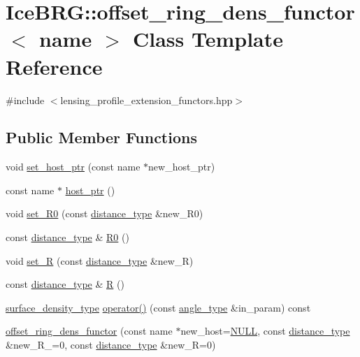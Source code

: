 \hypertarget{classIceBRG_1_1offset__ring__dens__functor}{}\section{Ice\+B\+R\+G\+:\+:offset\+\_\+ring\+\_\+dens\+\_\+functor$<$ name $>$ Class Template Reference}
\label{classIceBRG_1_1offset__ring__dens__functor}


{\ttfamily \#include $<$lensing\+\_\+profile\+\_\+extension\+\_\+functors.\+hpp$>$}

\subsection*{Public Member Functions}
\begin{DoxyCompactItemize}
\item 
void \hyperlink{classIceBRG_1_1offset__ring__dens__functor_a11e9887925f22c6acf2ed3b8f78f89ce}{set\+\_\+host\+\_\+ptr} (const name $\ast$new\+\_\+host\+\_\+ptr)
\item 
const name $\ast$ \hyperlink{classIceBRG_1_1offset__ring__dens__functor_a0b94e34137310f46887a7cb7df9627de}{host\+\_\+ptr} ()
\item 
void \hyperlink{classIceBRG_1_1offset__ring__dens__functor_a4f8bf37c7e60aff1ef5329814f9beb95}{set\+\_\+\+R0} (const \hyperlink{namespaceIceBRG_a45499647eb87e24c10ab32c628711cec}{distance\+\_\+type} \&new\+\_\+\+R0)
\item 
const \hyperlink{namespaceIceBRG_a45499647eb87e24c10ab32c628711cec}{distance\+\_\+type} \& \hyperlink{classIceBRG_1_1offset__ring__dens__functor_a8a1ea1a37e86c825198036c95a0ee9e3}{R0} ()
\item 
void \hyperlink{classIceBRG_1_1offset__ring__dens__functor_aa3223071b9e65b71402ffefab2d83eb5}{set\+\_\+\+R} (const \hyperlink{namespaceIceBRG_a45499647eb87e24c10ab32c628711cec}{distance\+\_\+type} \&new\+\_\+\+R)
\item 
const \hyperlink{namespaceIceBRG_a45499647eb87e24c10ab32c628711cec}{distance\+\_\+type} \& \hyperlink{classIceBRG_1_1offset__ring__dens__functor_add4b837a1fd48884eafd829b3fbbce03}{R} ()
\item 
\hyperlink{namespaceIceBRG_a80c597ef5ba0a32491d32a9f0083b02d}{surface\+\_\+density\+\_\+type} \hyperlink{classIceBRG_1_1offset__ring__dens__functor_aabb2d2e6a0eb4d61e7ae3004afb70354}{operator()} (const \hyperlink{namespaceIceBRG_a688eeb0811a2474b20b667ed2e9625a1}{angle\+\_\+type} \&in\+\_\+param) const 
\item 
\hyperlink{classIceBRG_1_1offset__ring__dens__functor_ab587512a09eb711a807d57bd58acdcfe}{offset\+\_\+ring\+\_\+dens\+\_\+functor} (const name $\ast$new\+\_\+host=\hyperlink{lib_2IceBRG__main_2common_8h_a070d2ce7b6bb7e5c05602aa8c308d0c4}{N\+U\+L\+L}, const \hyperlink{namespaceIceBRG_a45499647eb87e24c10ab32c628711cec}{distance\+\_\+type} \&new\+\_\+\+R\+\_=0, const \hyperlink{namespaceIceBRG_a45499647eb87e24c10ab32c628711cec}{distance\+\_\+type} \&new\+\_\+\+R=0)
\end{DoxyCompactItemize}


